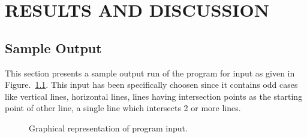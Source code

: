 %

\chapter{RESULTS AND DISCUSSION}
\label{chap:resultsdiscussion}

\section{Sample Output}
This section presents a sample output run of the program for input as given in Figure.~\ref{fig25}. This input has been specifically choosen since it contains odd cases like vertical lines, horizontal lines, lines having intersection points as the starting point of other line, a single line which intersects 2 or more lines.
\begin{figure}[ht]
  \begin{center}
  \end{center}
  \centering
	\parbox{5in}{\caption{Graphical representation of program input.} \label{fig25}} 
\end{figure}

